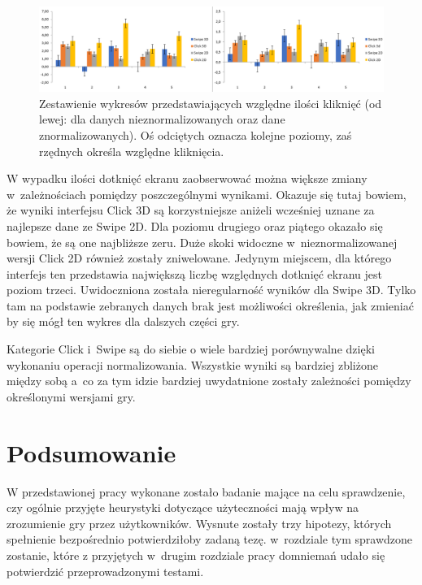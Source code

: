\documentclass[a4paper,12pt,numbers=noenddot]{report}
\begin{document}
\begin{figure}[h!]
	\centering
  	\includegraphics[width=\linewidth]{diag/rel_mean_clicksNorm.png}
	\caption{Zestawienie wykresów przedstawiających względne ilości kliknięć (od lewej: dla danych nieznormalizowanych oraz dane znormalizowanych). Oś odciętych oznacza kolejne poziomy, zaś rzędnych określa względne kliknięcia.}
	\label{fig:diag:rel:mean_ClicksNorm}
\end{figure}
W wypadku ilości dotknięć ekranu zaobserwować można większe zmiany w~zależnościach pomiędzy poszczególnymi wynikami. Okazuje się tutaj bowiem, że wyniki interfejsu Click 3D są korzystniejsze aniżeli wcześniej uznane za najlepsze dane ze Swipe 2D. Dla poziomu drugiego oraz piątego okazało się bowiem, że są one najbliższe zeru. Duże skoki widoczne w~nieznormalizowanej wersji Click 2D również zostały zniwelowane. Jedynym miejscem, dla którego interfejs ten przedstawia największą liczbę względnych dotknięć ekranu jest poziom trzeci.
Uwidoczniona została nieregularność wyników dla Swipe 3D. Tylko tam na podstawie zebranych danych brak jest możliwości określenia, jak zmieniać by się mógł ten wykres dla dalszych części gry.

Kategorie Click i~Swipe są do siebie o wiele bardziej porównywalne dzięki wykonaniu operacji normalizowania. Wszystkie wyniki są bardziej zbliżone między sobą a~co za tym idzie bardziej uwydatnione zostały zależności pomiędzy określonymi wersjami gry.

\chapter{Podsumowanie}

W przedstawionej pracy wykonane zostało badanie mające na celu sprawdzenie, czy ogólnie przyjęte heurystyki dotyczące użyteczności mają wpływ na zrozumienie gry przez użytkowników. Wysnute zostały trzy hipotezy, których spełnienie bezpośrednio potwierdziłoby zadaną tezę. w~rozdziale tym sprawdzone zostanie, które z przyjętych w~drugim rozdziale pracy domniemań udało się potwierdzić przeprowadzonymi testami.
\end{document}
